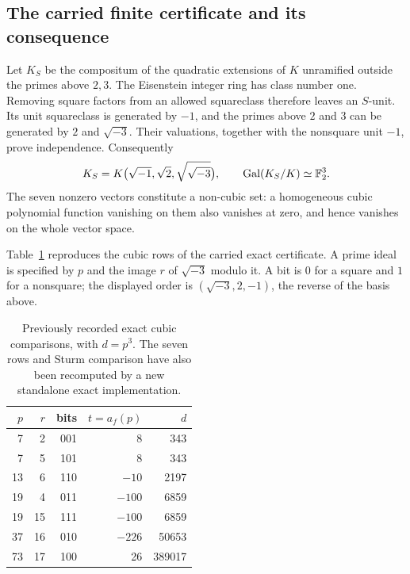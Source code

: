\subsection{The carried finite certificate and its consequence}
Let $K_S$ be the compositum of the quadratic extensions of $K$
unramified outside the primes above $2,3$. The Eisenstein integer ring
has class number one. Removing square factors from an allowed
squareclass therefore leaves an $S$-unit. Its unit squareclass is
generated by $-1$, and the primes above $2$ and $3$ can be generated
by $2$ and $\sqrt{-3}$. Their valuations, together with the nonsquare
unit $-1$, prove independence. Consequently
\[
 K_S=K\bigl(\sqrt{-1},\sqrt2,\sqrt{\sqrt{-3}}\bigr),
 \qquad\operatorname{Gal}(K_S/K)\simeq\mathbb F_2^3.
\]
The seven nonzero vectors constitute a non-cubic set: a homogeneous
cubic polynomial function vanishing on them also vanishes at zero,
and hence vanishes on the whole vector space.

Table~\ref{tab:cubic-certificate} reproduces the cubic rows of the
carried exact certificate. A prime ideal is specified by $p$ and the
image $r$ of $\sqrt{-3}$ modulo it. A bit is $0$ for a square and $1$
for a nonsquare; the displayed order is
$(\sqrt{-3},2,-1)$, the reverse of the basis above.
\begin{table}[htbp]
\centering
\begin{tabular}{rrrrr}
\hline
$p$ & $r$ & bits & $t=a_f(p)$ & $d$ \\
\hline
7  & 2  & 001 & 8    & 343 \\
7  & 5  & 101 & 8    & 343 \\
13 & 6  & 110 & $-10$  & 2197 \\
19 & 4  & 011 & $-100$ & 6859 \\
19 & 15 & 111 & $-100$ & 6859 \\
37 & 16 & 010 & $-226$ & 50653 \\
73 & 17 & 100 & 26   & 389017 \\
\hline
\end{tabular}
\caption{Previously recorded exact cubic comparisons, with $d=p^3$.
The seven rows and Sturm comparison have also been recomputed by a new
standalone exact implementation.}
\label{tab:cubic-certificate}
\end{table}

